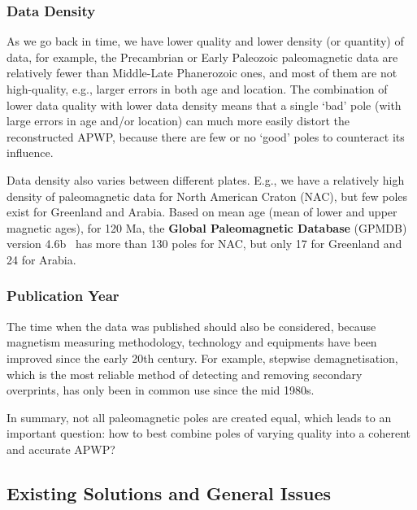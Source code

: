 \subsubsection{Data Density}

As we go back in time, we have lower quality and lower density (or quantity) of
data, for example, the Precambrian or Early Paleozoic paleomagnetic data are
relatively fewer than Middle-Late Phanerozoic ones, and most of them are not
high-quality, e.g., larger errors in both age and location. The combination of
lower data quality with lower data density means that a single `bad' pole (with
large errors in age and/or location) can much more easily distort the
reconstructed APWP, because there are few or no `good' poles to counteract its
influence.

Data density also varies between different plates. E.g., we have a relatively
high density of paleomagnetic data for North American Craton (NAC), but few
poles exist for Greenland and Arabia. Based on mean age (mean of lower and
upper magnetic ages), for 120 Ma, the \textbf{Global Paleomagnetic
Database} (GPMDB) version 4.6b~\cite{P05} has more than 130 poles for NAC, but
only 17 for Greenland and 24 for Arabia.

\subsubsection{Publication Year}

The time when the data was published should also be considered, because
magnetism measuring methodology, technology and equipments have been improved
since the early 20th century. For example, stepwise demagnetisation, which is
the most reliable method of detecting and removing secondary overprints, has
only been in common use since the mid 1980s.

In summary, not all paleomagnetic poles are created equal, which leads to an
important question: how to best combine poles of varying quality into a
coherent and accurate APWP\@?

\subsection{Existing Solutions and General Issues}

